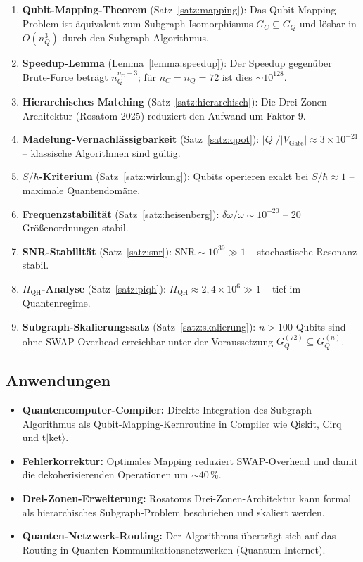 ﻿\documentclass[a4paper,12pt]{article}
\theoremstyle{definition}
\begin{document}
\begin{enumerate}
\item \textbf{Qubit-Mapping-Theorem} (Satz~\ref{satz:mapping}): Das
  Qubit-Mapping-Problem ist äquivalent zum Subgraph-Isomorphismus $G_C \subseteq G_Q$
  und lösbar in $O(n_Q^3)$ durch den Subgraph Algorithmus.

\item \textbf{Speedup-Lemma} (Lemma~\ref{lemma:speedup}): Der Speedup gegenüber
  Brute-Force beträgt $n_Q^{n_C-3}$; für $n_C = n_Q = 72$ ist dies $\sim 10^{128}$.

\item \textbf{Hierarchisches Matching} (Satz~\ref{satz:hierarchisch}): Die
  Drei-Zonen-Architektur (Rosatom 2025) reduziert den Aufwand um Faktor 9.

\item \textbf{Madelung-Vernachlässigbarkeit} (Satz~\ref{satz:qpot}):
  $|Q|/|V_\mathrm{Gate}| \approx 3\times10^{-21}$ -- klassische Algorithmen sind
  gültig.

\item \textbf{$S/\hbar$-Kriterium} (Satz~\ref{satz:wirkung}): Qubits operieren
  exakt bei $S/\hbar \approx 1$ -- maximale Quantendomäne.

\item \textbf{Frequenzstabilität} (Satz~\ref{satz:heisenberg}):
  $\delta\omega/\omega \sim 10^{-20}$ -- 20 Größenordnungen stabil.

\item \textbf{SNR-Stabilität} (Satz~\ref{satz:snr}):
  $\mathrm{SNR} \sim 10^{39} \gg 1$ -- stochastische Resonanz stabil.

\item \textbf{$\Pi_\mathrm{QH}$-Analyse} (Satz~\ref{satz:piqh}):
  $\Pi_\mathrm{QH} \approx 2{,}4\times10^6 \gg 1$ -- tief im Quantenregime.

\item \textbf{Subgraph-Skalierungssatz} (Satz~\ref{satz:skalierung}): $n > 100$
  Qubits sind ohne SWAP-Overhead erreichbar unter der Voraussetzung
  $G_Q^{(72)} \subseteq G_Q^{(n)}$.
\end{enumerate}

\subsection{Anwendungen}

\begin{itemize}
\item \textbf{Quantencomputer-Compiler:} Direkte Integration des Subgraph Algorithmus
  als Qubit-Mapping-Kernroutine in Compiler wie Qiskit, Cirq und t$|$ket$\rangle$.
\item \textbf{Fehlerkorrektur:} Optimales Mapping reduziert SWAP-Overhead und damit
  die dekoherisierenden Operationen um $\sim 40\,\%$.
\item \textbf{Drei-Zonen-Erweiterung:} Rosatoms Drei-Zonen-Architektur kann formal
  als hierarchisches Subgraph-Problem beschrieben und skaliert werden.
\item \textbf{Quanten-Netzwerk-Routing:} Der Algorithmus überträgt sich auf das
  Routing in Quanten-Kommunikationsnetzwerken (Quantum Internet).
\end{itemize}
\end{document}
